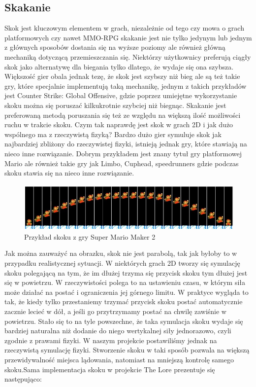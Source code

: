 \documentclass[oneside,polski,logo]{amuthesis}
\begin{document}
\subsection{Skakanie} 
Skok jest kluczowym elementem w grach, niezależnie od tego czy mowa o grach platformowych czy nawet MMO-RPG skakanie jest nie tylko jedynym lub jednym z głównych sposobów dostania się na wyższe poziomy ale również główną mechaniką dotyczącą przemieszczania się. Niektórzy użytkownicy preferują ciągły skok jako alternatywę dla biegania tylko dlatego, że wydaje się ona szybsza. Większość gier obala jednak tezę, że skok jest szybszy niż bieg ale są też takie gry, które specjalnie implementują taką mechanikę, jednym z takich przykładów jest Counter Strike: Global Offensive, gdzie poprzez umiejętne wykorzystanie skoku można się poruszać kilkukrotnie szybciej niż biegnąc. Skakanie jest preferowaną metodą poruszania się też ze względu na większą ilość możliwości ruchu w trakcie skoku.
Czym tak naprawdę jest skok w grach 2D i jak dużo wspólnego ma z rzeczywistą fizyką? Bardzo dużo gier symuluje skok jak najbardziej zbliżony do rzeczywistej fizyki, istnieją jednak gry, które stawiają na nieco inne rozwiązanie. Dobrym przykładem jest znany tytuł gry platformowej Mario ale również takie gry jak Limbo, Cuphead, speedrunners gdzie podczas skoku stawia się na nieco inne rozwiązanie. 
\begin{figure}[h]
	\centering
	\includegraphics[width=13cm]{images/kozubal/mario.jpg}
	\caption{Przykład skoku z gry Super Mario Maker 2}
\end{figure}

Jak można zauważyć na obrazku, skok nie jest parabolą, tak jak byłoby to w przypadku realistycznej sytuacji. W niektórych grach 2D tworzy się symulację skoku polegającą na tym, że im dłużej trzyma się przycisk skoku tym dłużej jest się w powietrzu. W rzeczywistości polega to na ustawieniu czasu, w którym siła może działać na postać i ograniczenia jej górnego limitu. W praktyce wygląda to tak, że kiedy tylko przestaniemy trzymać przycisk skoku postać automatycznie zacznie lecieć w dół, a jeśli go przytrzymamy postać na chwilę zawiśnie w powietrzu. Stało się to na tyle powszechne, że taka symulacja skoku wydaje się bardziej naturalna niż dodanie do niego wertykalnej siły jednorazowo, czyli zgodnie z prawami fizyki.  W naszym projekcie postawiliśmy jednak na rzeczywistą symulację fizyki. Stworzenie skoku w taki sposób pozwala na większą przewidywalność miejsca lądowania, natomiast na mniejszą kontrolę samego skoku.Sama implementacja skoku w projekcie The Lore prezentuje się następująco:
\end{document}
